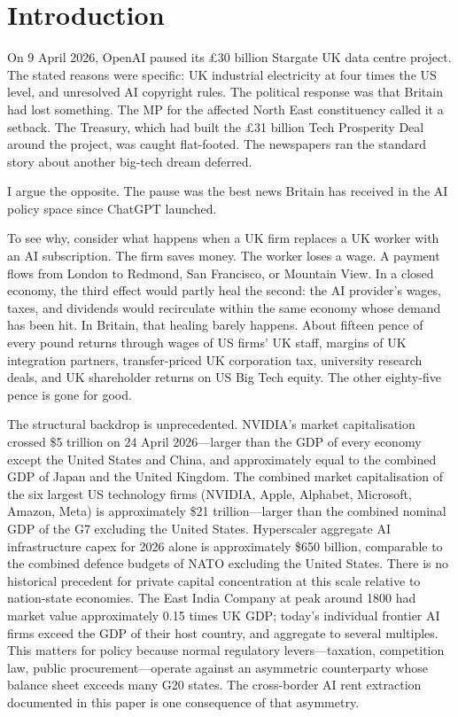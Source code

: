 \documentclass[11pt,letterpaper]{article}
\theoremstyle{remark}
\begin{document}
\section{Introduction}

On 9 April 2026, OpenAI paused its \pounds30 billion Stargate {UK} data centre project. The stated reasons were specific: {UK} industrial electricity at four times the {US} level, and unresolved {AI} copyright rules. The political response was that Britain had lost something. The {MP} for the affected North East constituency called it a setback. The Treasury, which had built the \pounds31 billion Tech Prosperity Deal around the project, was caught flat-footed. The newspapers ran the standard story about another big-tech dream deferred.

I argue the opposite. The pause was the best news Britain has received in the {AI} policy space since ChatGPT launched.

To see why, consider what happens when a {UK} firm replaces a {UK} worker with an {AI} subscription. The firm saves money. The worker loses a wage. A payment flows from London to Redmond, San Francisco, or Mountain View. In a closed economy, the third effect would partly heal the second: the {AI} provider's wages, taxes, and dividends would recirculate within the same economy whose demand has been hit. In Britain, that healing barely happens. About fifteen pence of every pound returns through wages of {US} firms' {UK} staff, margins of {UK} integration partners, transfer-priced {UK} corporation tax, university research deals, and {UK} shareholder returns on {US} Big Tech equity. The other eighty-five pence is gone for good.

The structural backdrop is unprecedented. NVIDIA's market capitalisation crossed \$5 trillion on 24 April 2026---larger than the {GDP} of every economy except the United States and China, and approximately equal to the combined {GDP} of Japan and the United Kingdom. The combined market capitalisation of the six largest {US} technology firms (NVIDIA, Apple, Alphabet, Microsoft, Amazon, Meta) is approximately \$21 trillion---larger than the combined nominal {GDP} of the {G7} excluding the United States. Hyperscaler aggregate AI infrastructure capex for 2026 alone is approximately \$650 billion, comparable to the combined defence budgets of {NATO} excluding the United States. There is no historical precedent for private capital concentration at this scale relative to nation-state economies. The East India Company at peak around 1800 had market value approximately 0.15 times {UK} {GDP}; today's individual frontier {AI} firms exceed the {GDP} of their host country, and aggregate to several multiples. This matters for policy because normal regulatory levers---taxation, competition law, public procurement---operate against an asymmetric counterparty whose balance sheet exceeds many {G20} states. The cross-border {AI} rent extraction documented in this paper is one consequence of that asymmetry.
\end{document}
